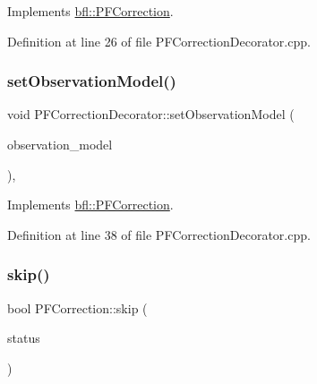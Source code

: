 Implements \mbox{\hyperlink{classbfl_1_1PFCorrection_a4310e630d4c269bd66557e44e5deecb0}{bfl\+::\+P\+F\+Correction}}.



Definition at line 26 of file P\+F\+Correction\+Decorator.\+cpp.

\mbox{\label{classbfl_1_1PFCorrectionDecorator_a2574837bfdfa72f3da92b4cdacfe5a89}} 
\subsubsection{\texorpdfstring{set\+Observation\+Model()}{setObservationModel()}}
{\footnotesize\ttfamily void P\+F\+Correction\+Decorator\+::set\+Observation\+Model (\begin{DoxyParamCaption}\item[{std\+::unique\+\_\+ptr$<$ \mbox{\hyperlink{classbfl_1_1ObservationModel}{Observation\+Model}} $>$}]{observation\+\_\+model }\end{DoxyParamCaption})\hspace{0.3cm}{\ttfamily [override]}, {\ttfamily [virtual]}}



Implements \mbox{\hyperlink{classbfl_1_1PFCorrection_a437fcf552a85f427d1369d8e43e56144}{bfl\+::\+P\+F\+Correction}}.



Definition at line 38 of file P\+F\+Correction\+Decorator.\+cpp.

\mbox{\label{classbfl_1_1PFCorrection_ab25e625ea12fe257e0eb85d465835e62}} 
\subsubsection{\texorpdfstring{skip()}{skip()}}
{\footnotesize\ttfamily bool P\+F\+Correction\+::skip (\begin{DoxyParamCaption}\item[{const bool}]{status }\end{DoxyParamCaption})\hspace{0.3cm}{\ttfamily [inherited]}}




